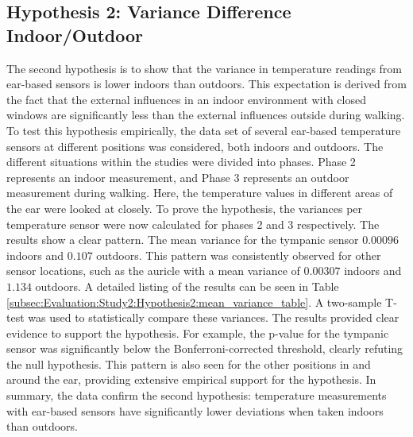 \subsection{Hypothesis 2: Variance Difference Indoor/Outdoor}
\label{subsec:Evaluation:Study2:Hypothesis2}

The second hypothesis is to show that the variance in temperature readings from ear-based sensors is lower indoors than outdoors.
This expectation is derived from the fact that the external influences in an indoor environment with closed windows are significantly less than the external influences outside during walking.
To test this hypothesis empirically, the data set of several ear-based temperature sensors at different positions was considered, both indoors and outdoors.
The different situations within the studies were divided into phases. 
Phase 2 represents an indoor measurement, and Phase 3 represents an outdoor measurement during walking.
Here, the temperature values in different areas of the ear were looked at closely.
To prove the hypothesis, the variances per temperature sensor were now calculated for phases 2 and 3 respectively. 
The results show a clear pattern. 
The mean variance for the tympanic sensor $0.00096$ indoors and \(0.107\) outdoors.
This pattern was consistently observed for other sensor locations, such as the auricle with a mean variance of $0.00307$ indoors and $1.134$ outdoors.
A detailed listing of the results can be seen in Table \ref{subsec:Evaluation:Study2:Hypothesis2:mean_variance_table}.
A two-sample T-test was used to statistically compare these variances.
The results provided clear evidence to support the hypothesis.
For example, the p-value for the tympanic sensor was significantly below the Bonferroni-corrected threshold, clearly refuting the null hypothesis.
This pattern is also seen for the other positions in and around the ear, providing extensive empirical support for the hypothesis.
In summary, the data confirm the second hypothesis: temperature measurements with ear-based sensors have significantly lower deviations when taken indoors than outdoors.

